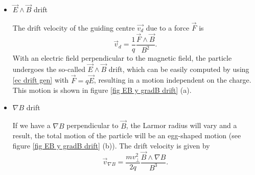 \documentclass[a4paper,12pt,oneside]{book}
\begin{document}
\begin{itemize}

\item $\vec{E} \wedge \vec{B}$ drift

The drift velocity of the guiding centre $\vec{v_d}$ due to a force $\vec{F}$ is 
%
\begin{equation}\label{ec drift gen}
\vec{v}_d=\dfrac{1}{q}\dfrac{\vec{F} \wedge \vec{B}}{B^2}.
\end{equation}
%
With an electric field perpendicular to the magnetic field, the particle undergoes the so-called $\vec{E} \wedge \vec{B}$ drift, which can be easily computed by using \eqref{ec drift gen} with $\vec{F}=q \vec{E}$, resulting in a motion independent on the charge. This motion is shown in figure  \ref{fig EB y gradB drift} (a).%



\item $\nabla B$ drift

If we have a $\nabla B$ perpendicular to $\vec{B}$, the Larmor radius will vary and a result, the total motion of the particle will be an egg-shaped motion (see figure \ref{fig EB y gradB drift} (b)). The drift velocity is given by
%
\begin{equation}\label{nablaB drift}
\vec{v}_{\nabla B}=\dfrac{m v_{\perp}^2}{2q} \dfrac{\vec{B} \wedge \nabla B}{B^3}.
\end{equation}




\end{itemize}
\end{document}
